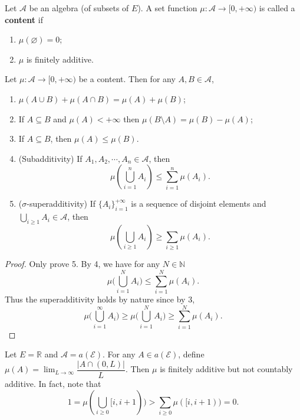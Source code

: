 \documentclass[11pt,singlecolumn, openany, citestyle=authoryear]{elegantbook}
\begin{document}
\begin{CJK}{UTF8}{gbsn}
\begin{definition}
    Let $\mathcal{A}$ be an algebra (of subsets of $E$). A set function $\mu:
    \mathcal{A} \to [0,+\infty)$ is called a \textbf{content} if 
    \begin{enumerate}
        \item $\mu(\varnothing)=0$;
        \item $\mu$ is finitely additive.
    \end{enumerate}
\end{definition}
\begin{lemma}
    Let $\mu:\mathcal{A} \to [0,+\infty)$ be a content. Then for any $A,B \in \mathcal{A}$,
    \begin{enumerate}
        \item $\mu(A \cup B) +\mu(A \cap B) = \mu(A)+\mu(B)$;
        \item If $A \subseteq B$ and $\mu(A)< +\infty$ then 
        $\mu(B \setminus A)=\mu(B)-\mu(A)$;
        \item If $A \subseteq B$, then $\mu(A)\leqslant \mu(B)$.
        \item (Subadditivity) If $A_1,A_2,\cdots,A_n \in \mathcal{A}$, then 
        $$
        \mu(\bigcup_{i=1}^n A_i)\leqslant \sum_{i=1}^n \mu(A_i).
        $$
        \item ($\sigma$-superadditivity) If $\{A_i\}_{i=1}^{+\infty}$ is a sequence of disjoint elements and 
        $\displaystyle \bigcup_{i\geqslant 1}A_i \in \mathcal{A}$, then 
        $$
        \mu(\bigcup_{i \geqslant 1}A_i) \geqslant \sum_{i\geqslant 1}\mu(A_i).
        $$
    \end{enumerate}
\end{lemma}
\begin{proof}
    Only prove 5. By 4, we have for any $N\in\mathbb{N}$
    $$
    \mu\bigg(\bigcup_{i=1}^N A_i\bigg) \leqslant \sum_{i=1}^N \mu(A_i).
    $$
    Thus the superadditivity holds by nature since by 3,
    $$
    \mu\bigg(\bigcup_{i=1}^\infty A_i\bigg) \geqslant \mu\bigg(\bigcup_{i=1}^N A_i\bigg)
    \geqslant \sum_{i=1}^N \mu(A_i).
    $$
\end{proof}
\begin{example}
    Let $E = \mathbb{R}$ and $\mathcal{A}=a(\mathcal{E})$. For any $A \in a(\mathcal{E})$,
    define $\displaystyle \mu(A)=\lim_{L \to \infty}\dfrac{|A \cap (0,L)|}{L}$. Then 
    $\mu$ is finitely additive but not countably additive. In fact, note that  
    $$
    1 = \mu(\bigcup_{i\geqslant 0}[i,i+1)) > \sum_{i\geqslant 0}\mu([i,i+1))=0.
    $$
\end{example}


\end{CJK}
\end{document}
